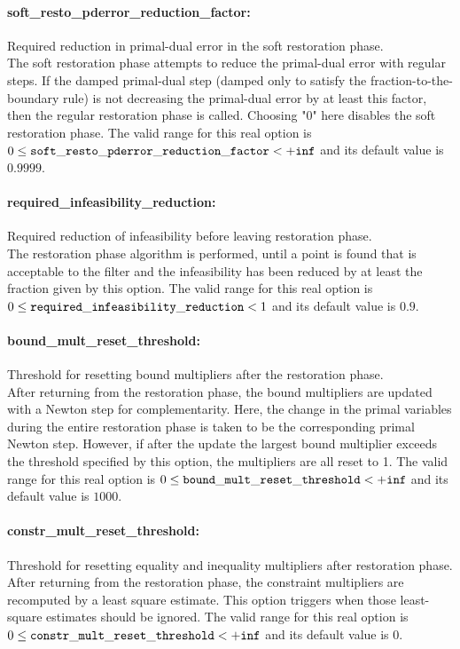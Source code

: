 \paragraph{soft\_resto\_pderror\_reduction\_factor:} Required reduction in primal-dual error in the soft restoration phase. $\;$ \\
 The soft restoration phase attempts to reduce the
primal-dual error with regular steps. If the
damped primal-dual step (damped only to satisfy
the fraction-to-the-boundary rule) is not
decreasing the primal-dual error by at least this
factor, then the regular restoration phase is
called. Choosing "0" here disables the soft
restoration phase. The valid range for this real option is 
$0 \le {\tt soft\_resto\_pderror\_reduction\_factor } <  {\tt +inf}$
and its default value is $0.9999$.


\paragraph{required\_infeasibility\_reduction:} Required reduction of infeasibility before leaving restoration phase. $\;$ \\
 The restoration phase algorithm is performed,
until a point is found that is acceptable to the
filter and the infeasibility has been reduced by
at least the fraction given by this option. The valid range for this real option is 
$0 \le {\tt required\_infeasibility\_reduction } <  1$
and its default value is $0.9$.


\paragraph{bound\_mult\_reset\_threshold:} Threshold for resetting bound multipliers after the restoration phase. $\;$ \\
 After returning from the restoration phase, the
bound multipliers are updated with a Newton step
for complementarity.  Here, the change in the
primal variables during the entire restoration
phase is taken to be the corresponding primal
Newton step. However, if after the update the
largest bound multiplier exceeds the threshold
specified by this option, the multipliers are all
reset to 1. The valid range for this real option is 
$0 \le {\tt bound\_mult\_reset\_threshold } <  {\tt +inf}$
and its default value is $1000$.


\paragraph{constr\_mult\_reset\_threshold:} Threshold for resetting equality and inequality multipliers after restoration phase. $\;$ \\
 After returning from the restoration phase, the
constraint multipliers are recomputed by a least
square estimate.  This option triggers when those
least-square estimates should be ignored. The valid range for this real option is 
$0 \le {\tt constr\_mult\_reset\_threshold } <  {\tt +inf}$
and its default value is $0$.


